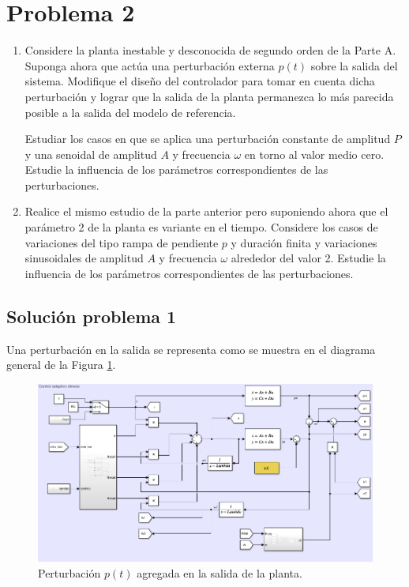 \documentclass[letterpaper,11pt]{article} %
\begin{document}
\section{Problema 2}
\begin{enumerate}[]
\item Considere la planta inestable y desconocida de segundo orden de la Parte A. Suponga ahora que actúa una perturbación externa $p(t)$ sobre la salida del sistema. Modifique el diseño del controlador para tomar en cuenta dicha perturbación y lograr que la salida de la planta permanezca lo más parecida posible a la salida del modelo de referencia.

Estudiar los casos en que se aplica una perturbación constante de amplitud $P$ y una senoidal de amplitud $A$ y frecuencia $\omega$ en torno al valor medio cero. Estudie la influencia de los parámetros correspondientes de las perturbaciones.

\item Realice el mismo estudio de la parte anterior pero suponiendo ahora que el parámetro 2 de la planta es variante en el tiempo. Considere los casos de variaciones del tipo rampa de pendiente $p$ y duración finita y variaciones sinusoidales de amplitud $A$ y frecuencia $\omega$ alrededor del valor 2. Estudie la influencia de los parámetros correspondientes de las perturbaciones.
\end{enumerate}

\subsection{Solución problema 1}

Una perturbación en la salida se representa como se muestra en el diagrama general de la Figura \ref{plantaperturbacion}.
\begin{figure}[h]
	\centering
	\includegraphics[width=14cm]{plantaperturbacion.png}
	\caption{Perturbación $p(t)$ agregada en la salida de la planta.}
	\label{plantaperturbacion}
\end{figure}
\end{document}
